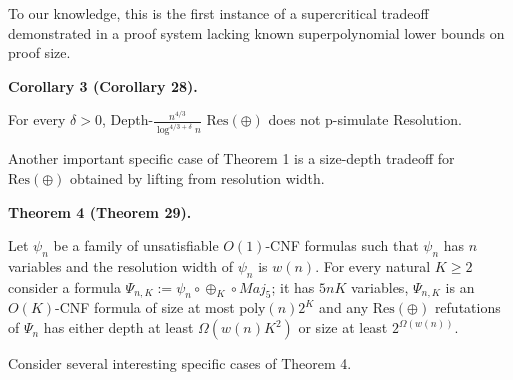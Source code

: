 To our knowledge, this is the first instance of a supercritical tradeoff demonstrated
in a proof system lacking known superpolynomial lower bounds on proof size.\par



\par\medskip\noindent\textbf{
Corollary 3 (Corollary 28).
}\par



For every $\delta>0$, Depth-$\frac{n^{4/3}}{\log^{4/3+\delta}n}$
$\mathrm{Res}(\oplus)$ does not p-simulate Resolution.\par




Another important specific case of Theorem 1 is a size-depth
tradeoff for $\mathrm{Res}(\oplus)$ obtained by lifting from resolution width.\par



\par\medskip\noindent\textbf{
Theorem 4 (Theorem 29).
}\par



Let $\psi_{n}$ be a family of unsatisfiable $O(1)$-CNF formulas such that
$\psi_{n}$ has $n$ variables and the resolution width of $\psi_{n}$ is $w(n)$.
For every natural $K\geq 2$ consider a formula
$\Psi_{n,K}:=\psi_{n}\circ\oplus_{K}\circ Maj_{5}$; it has $5nK$ variables,
$\Psi_{n,K}$ is an $O(K)$-CNF formula of size at most $\mathrm{poly}(n)2^{K}$ and any
$\mathrm{Res}(\oplus)$ refutations of $\Psi_{n}$ has either depth at least $\Omega(w(n)K^{2})$
or size at least $2^{\Omega(w(n))}$.\par




Consider several interesting specific cases of Theorem 4.\par



